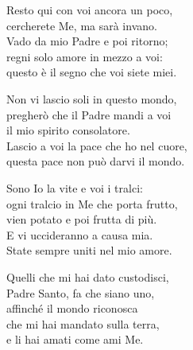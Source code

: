 
\strofa Resto qui con voi ancora un poco,\\
cercherete Me, ma sarà invano.\\
Vado da mio Padre e poi ritorno;\\
regni solo amore in mezzo a voi:\\
questo è il segno che voi siete miei.

\spazio

\strofa Non vi lascio soli in questo mondo,\\
pregherò che il Padre mandi a voi\\
il mio spirito consolatore.\\
Lascio a voi la pace che ho nel cuore,\\
questa pace non può darvi il mondo.

\spazio

\strofa Sono Io la vite e voi i tralci:\\
ogni tralcio in Me che porta frutto,\\
vien potato e poi frutta di più.\\
E vi uccideranno a causa mia.\\
State sempre uniti nel mio amore.

\spazio

\strofa Quelli che mi hai dato custodisci,\\
Padre Santo, fa che siano uno,\\
affinché il mondo riconosca\\
che mi hai mandato sulla terra,\\
e li hai amati come ami Me.